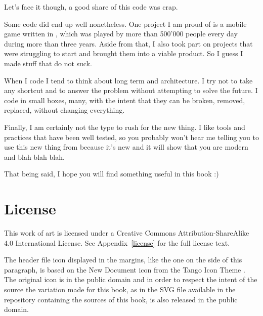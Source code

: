 Let's face it though, a good share of this code was crap.

\bigskip

Some code did end up well nonetheless. One project I am proud of is a
mobile game written in \cpp, which was played by more than 500'000
people every day during more than three years. Aside from that, I also
took part on projects that were struggling to start and brought them
into a viable product. So I guess I made stuff that do not suck.

When I code I tend to think about long term and architecture. I try
not to take any shortcut and to answer the problem without attempting
to solve the future. I code in small boxes, many, with the intent that
they can be broken, removed, replaced, without changing everything.

Finally, I am certainly not the type to rush for the new thing. I like
tools and practices that have been well tested, so you probably won't
hear me telling you to use this new thing from  because it's
new and it will show that you are modern and blah blah blah.

\bigskip

That being said, I hope you will find something useful in this book :)

\section{License}
This work of art is licensed under a Creative Commons
Attribution-ShareAlike 4.0 International License. See
Appendix~\ref{license} for the full license text.

%
%
The header file icon displayed in the margins, like the one on the
side of this paragraph, is based on the New Document icon from the
Tango Icon Theme \cite{tango-icon-theme}. The original icon is in the
public domain and in order to respect the intent of the source the
variation made for this book, as in the SVG file available in the
repository containing the sources of this book, is also released in
the public domain.

\renewcommand*\thesection{\arabic{chapter}.\arabic{section}}
